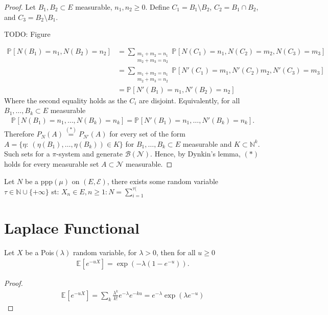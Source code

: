 \begin{proof}
Let $B_1,B_2 \subset E$ measurable, $n_1,n_2\geq 0$. Define $C_1 = B_1 \setminus B_2$, $C_2 = B_1 \cap B_2$, and $C_3= B_2 \setminus B_1$. 

{\color{blue} TODO: Figure}

\begin{align}
	\mathbb{P}_{} \left[ N(B_1)=n_1, N(B_2)=n_2 \right] &= \sum_{\substack{m_1+m_2 = n_1\\ m_2+m_3 = n_2}}^{} \mathbb{P}_{} \left[ N(C_1) = n_1, N(C_2)=m_2, N(C_3)=m_3 \right] \\ 
							    &= \sum_{\substack{m_1+m_2 = n_1\\ m_2+m_3 = n_2}}^{} \mathbb{P}_{} \left[ N'(C_1)=m_1, N'(C_2)m_2,N'(C_3)=m_3 \right] \\
							    &= \mathbb{P}_{} \left[ N'(B_1)=n_1, N'(B_2)=n_2 \right] 
\end{align}
Where the second equality holds as the $C_i$ are disjoint. Equivalently, for all $B_1,\ldots , B_k \subset E$ measurable
\begin{align}
	\mathbb{P}_{} \left[ N(B_1)=n_1,\ldots , N(B_k)=n_k \right] = \mathbb{P}_{} \left[ N'(B_1)=n_1, \ldots, N'(B_k)=n_k \right]. 
\end{align}
Therefore $P_N(A) \stackrel{(*)}{=} P_{N'}(A)$ for every set of the form $A=\{\eta: \ (\eta(B_1),\ldots ,\eta(B_k) ) \in K\}$ for $B_1,\ldots ,B_k \subset E$ measurable and $K \subset \mathbb{N}^{k}$. Such sets for a $\pi $-system and generate $\mathcal{B}(\mathcal{N})$. Hence, by Dynkin's lemma, $(*)$ holds for every measurable set $A \subset \mathcal{N}$ measurable.  
\end{proof}


\begin{theorem}
	Let $N$ be a ppp$(\mu )$ on $(E, \mathcal{E})$, there exists some random variable $\tau \in \mathbb{N} \cup \{+\infty \}$ st: $X_n \in E, n\geq 1: N = \sum_{i=1}^{\tau(} $
\end{theorem}

\section{Laplace Functional}
\begin{lemma}[]
Let $X$ be a Pois$(\lambda )$ random variable, for $\lambda > 0$, then for all $u\geq 0$ 
\begin{align}
\mathbb{E}_{} \left[ e^{-u X} \right] = \exp( - \lambda (1 - e^{-u})).
\end{align}
\end{lemma}
\begin{proof}
	\begin{align}
		\mathbb{E}_{} \left[ e^{-u X} \right] = \sum_{k}^{} \frac{\lambda^{k}}{k!}e^{-\lambda }e^{-ku} = e^{-\lambda }\exp(\lambda e^{-u})
	\end{align}
\end{proof}

